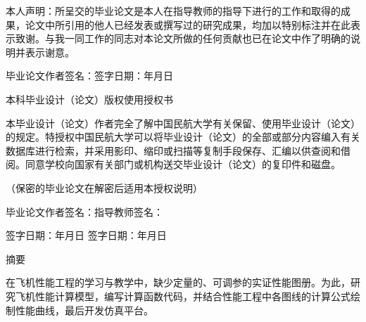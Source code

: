 \documentclass[a4paper,punct,space,heading=true,AutoFakeBold]{ctexrep}
\begin{document}
\begin{titlepage}
        本人声明：所呈交的毕业论文是本人在指导教师的指导下进行的工作和取得的成果，论文中所引用的他人已经发表或撰写过的研究成果，均加以特别标注并在此表示致谢。与我一同工作的同志对本论文所做的任何贡献也已在论文中作了明确的说明并表示谢意。

        \vspace{3.8em}

        毕业论文作者签名：\quad\quad\quad 签字日期：\qquad\qquad 年\quad 月\quad 日

        \vspace{1.8em}


        \begin{center}
            \heiti
            \setlength{\baselineskip}{18pt} %
            \qquad 本科毕业设计（论文）版权使用授权书
        \end{center} %

        \vspace{0.5em}
        {
        \fangsong
        \setlength{\baselineskip}{28pt} %
        本毕业设计（论文）作者完全了解中国民航大学有关保留、使用毕业设计（论文）的规定。特授权中国民航大学可以将毕业设计（论文）的全部或部分内容编入有关数据库进行检索，并采用影印、缩印或扫描等复制手段保存、汇编以供查阅和借阅。同意学校向国家有关部门或机构送交毕业设计（论文）的复印件和磁盘。

        （保密的毕业论文在解密后适用本授权说明）

        \vspace{1.8em}

        毕业论文作者签名：\quad\quad\quad\qquad 指导教师签名：

\vspace{1.8em}

签字日期：\qquad 年\quad 月\quad 日  \qquad  签字日期：\qquad 年\quad 月\quad 日



        }
\end{titlepage}
\thispagestyle{empty}
\newpage
\setlength{\headsep}{1.224cm}
\begin{center}
\heiti 摘\quad 要
\end{center}
\vspace{21pt}


\setlength{\baselineskip}{20pt}
在飞机性能工程的学习与教学中，缺少定量的、可调参的实证性能图册。为此，研究飞机性能计算模型，编写计算函数代码，并结合性能工程中各图线的计算公式绘制性能曲线，最后开发仿真平台。
\end{document}
